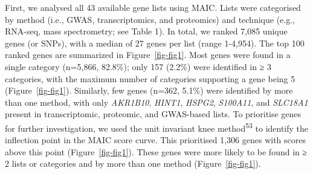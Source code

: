 \documentclass[
  11,
  a4paper,
]{article}
\begin{document}
First, we analysed all 43 available gene lists using MAIC. Lists were
categorised by method (i.e., GWAS, transcriptomics, and proteomics) and
technique (e.g., RNA-seq, mass spectrometry; see Table 1). In total, we
ranked 7,085 unique genes (or SNPs), with a median of 27 genes per list
(range 1-4,954). The top 100 ranked genes are summarized in
Figure~\ref{fig-fig1}. Most genes were found in a single category
(n=5,866, 82.8\%); only 157 (2.2\%) were identified in ≥ 3 categories,
with the maximum number of categories supporting a gene being 5
(Figure~\ref{fig-fig1}). Similarly, few genes (n=362, 5.1\%) were
identified by more than one method, with only \emph{AKR1B10},
\emph{HINT1}, \emph{HSPG2}, \emph{S100A11}, and \emph{SLC18A1} present
in transcriptomic, proteomic, and GWAS-based lists. To prioritise genes
for further investigation, we used the unit invariant knee
method\textsuperscript{53} to identify the inflection point in the MAIC
score curve. This prioritised 1,306 genes with scores above this point
(Figure~\ref{fig-fig1}). These genes were more likely to be found in ≥ 2
lists or categories and by more than one method (Figure~\ref{fig-fig1}).
\end{document}
